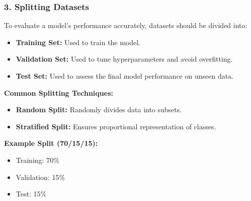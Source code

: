 \documentclass[aspectratio=169]{beamer}
\begin{document}
\begin{frame}[fragile]
    \frametitle{3. Splitting Datasets}
    To evaluate a model's performance accurately, datasets should be divided into:
    
    \begin{itemize}
        \item \textbf{Training Set:} Used to train the model.
        \item \textbf{Validation Set:} Used to tune hyperparameters and avoid overfitting.
        \item \textbf{Test Set:} Used to assess the final model performance on unseen data.
    \end{itemize}
    
    \textbf{Common Splitting Techniques:}
    
    \begin{itemize}
        \item \textbf{Random Split:} Randomly divides data into subsets.
        \item \textbf{Stratified Split:} Ensures proportional representation of classes.
    \end{itemize}
    
    \textbf{Example Split (70/15/15):}
    \begin{itemize}
        \item Training: 70\%
        \item Validation: 15\%
        \item Test: 15\%
    \end{itemize}
\end{frame}
\end{document}
